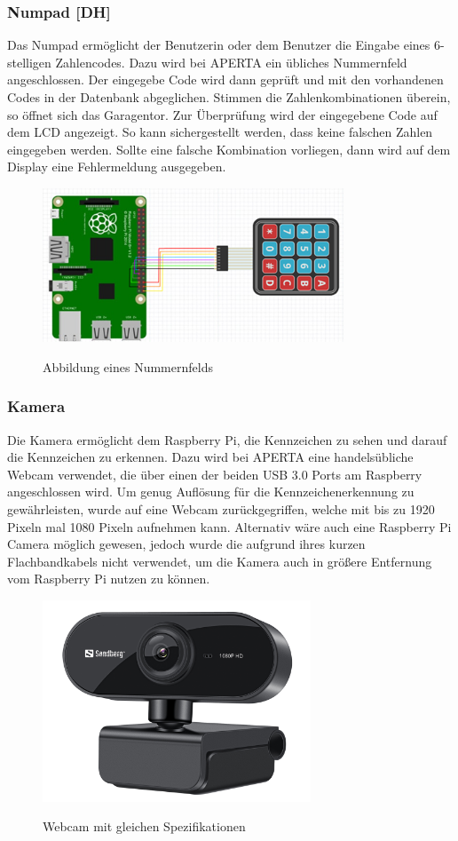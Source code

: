\subsubsection{Numpad [DH]}
Das Numpad ermöglicht der Benutzerin oder dem Benutzer die Eingabe eines 6-stelligen Zahlencodes. Dazu wird bei APERTA ein übliches Nummernfeld angeschlossen. Der eingegebe Code wird dann geprüft und mit den vorhandenen Codes in der Datenbank abgeglichen. Stimmen die Zahlenkombinationen überein, so öffnet sich das Garagentor. Zur Überprüfung wird der eingegebene Code auf dem LCD angezeigt. So kann sichergestellt werden, dass keine falschen Zahlen eingegeben werden. Sollte eine falsche Kombination vorliegen, dann wird auf dem Display eine Fehlermeldung ausgegeben.
\begin{figure}
  \centering
  \includegraphics[width=0.8\textwidth]{pics/Nummerfeld.png}
  \caption{Abbildung eines Nummernfelds}
  \cite{Nummernfeld}
\end{figure}
\subsubsection{Kamera}
Die Kamera ermöglicht dem Raspberry Pi, die Kennzeichen zu sehen und darauf die Kennzeichen zu erkennen. Dazu wird bei APERTA eine handelsübliche Webcam verwendet, die über einen der beiden USB 3.0 Ports am Raspberry angeschlossen wird.
Um genug Auflösung für die Kennzeichenerkennung zu gewährleisten, wurde auf eine Webcam zurückgegriffen, welche mit bis zu 1920 Pixeln mal 1080 Pixeln aufnehmen kann.
Alternativ wäre auch eine Raspberry Pi Camera möglich gewesen, jedoch wurde die aufgrund ihres kurzen Flachbandkabels nicht verwendet, um die Kamera auch in größere Entfernung vom Raspberry Pi nutzen zu können.
\begin{figure}[H]
  \centering
  \includegraphics[width=8cm]{pics/Webcam.jpg}
  \caption{Webcam mit gleichen Spezifikationen}
  \cite{Webcam}
\end{figure}

